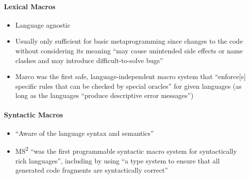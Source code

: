 \paragraph{Lexical Macros}
\begin{itemize}
      \item Language agnostic \citep[p.~113:3]{lilis_survey_2019}
      \item Usually only sufficient for basic metaprogramming since changes to
            the code without considering its meaning ``may cause unintended side
            effects or name clashes and may introduce difficult-to-solve bugs''
            \citep[p.~113:5]{lilis_survey_2019}
      \item Marco was the first safe, language-independent macro system that
            ``enforce[s] specific rules that can be checked by special oracles''
            for given languages (as long as the languages ``produce descriptive
            error messages'') \citep[p.~113:6]{lilis_survey_2019}
\end{itemize}

\paragraph{Syntactic Macros}
\begin{itemize}
      \item ``Aware of the language syntax and semantics''
            \citep[p.~113:3]{lilis_survey_2019}
      \item MS\textsuperscript{2} ``was the first programmable syntactic macro
            system for syntactically rich languages'', including by using ``a
            type system to ensure that all generated code fragments are
            syntactically correct'' \citep[p.~113:5]{lilis_survey_2019}
\end{itemize}

